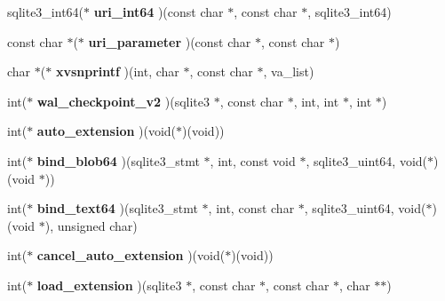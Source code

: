 \begin{DoxyCompactItemize}
sqlite3\+\_\+int64($\ast$ {\bfseries uri\+\_\+int64} )(const char $\ast$, const char $\ast$, sqlite3\+\_\+int64)
\item 
\mbox{\label{structsqlite3__api__routines_add5f520297676876e836eec5c976c6ba}} 
const char $\ast$($\ast$ {\bfseries uri\+\_\+parameter} )(const char $\ast$, const char $\ast$)
\item 
\mbox{\label{structsqlite3__api__routines_ad7af935fd4233623388f4d4ed710a0b0}} 
char $\ast$($\ast$ {\bfseries xvsnprintf} )(int, char $\ast$, const char $\ast$, va\+\_\+list)
\item 
\mbox{\label{structsqlite3__api__routines_a86ce375053098d8fbb2d686e9d98d12e}} 
int($\ast$ {\bfseries wal\+\_\+checkpoint\+\_\+v2} )(sqlite3 $\ast$, const char $\ast$, int, int $\ast$, int $\ast$)
\item 
\mbox{\label{structsqlite3__api__routines_a19d7b88cb46d7c9984c681eaf3ebf1a6}} 
int($\ast$ {\bfseries auto\+\_\+extension} )(void($\ast$)(void))
\item 
\mbox{\label{structsqlite3__api__routines_aa34e69966762f91f4570cee3cb8f630f}} 
int($\ast$ {\bfseries bind\+\_\+blob64} )(sqlite3\+\_\+stmt $\ast$, int, const void $\ast$, sqlite3\+\_\+uint64, void($\ast$)(void $\ast$))
\item 
\mbox{\label{structsqlite3__api__routines_aab0cca7b94c71fa0e335cdbb17820ab5}} 
int($\ast$ {\bfseries bind\+\_\+text64} )(sqlite3\+\_\+stmt $\ast$, int, const char $\ast$, sqlite3\+\_\+uint64, void($\ast$)(void $\ast$), unsigned char)
\item 
\mbox{\label{structsqlite3__api__routines_ad2af85260429714c4bde212f2d0f0516}} 
int($\ast$ {\bfseries cancel\+\_\+auto\+\_\+extension} )(void($\ast$)(void))
\item 
\mbox{\label{structsqlite3__api__routines_a33eef15b418c498b26cd052daf668f01}} 
int($\ast$ {\bfseries load\+\_\+extension} )(sqlite3 $\ast$, const char $\ast$, const char $\ast$, char $\ast$$\ast$)
\item 
$$
\end{DoxyCompactItemize}
